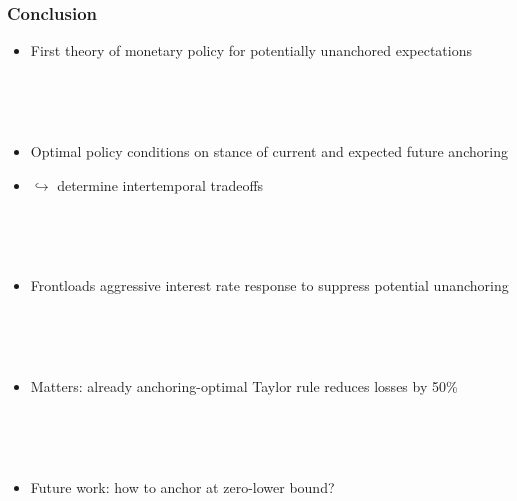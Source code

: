 \documentclass[10pt]{beamer}
\def\movei{5 }
\begin{document}
\begin{frame}
	\frametitle{Conclusion}

\vspace{0.5cm}
	
\begin{itemize}
\item First theory of monetary policy for potentially unanchored expectations 

\

\

\item Optimal policy conditions on stance of current and expected future anchoring
\item[] \hspace{4cm} $\hookrightarrow$ determine intertemporal tradeoffs

\

\

\item Frontloads aggressive interest rate response to suppress potential unanchoring

\

\

\item Matters: already anchoring-optimal Taylor rule reduces losses by 50\%

\

\

\item Future work: how to anchor at zero-lower bound?

\end{itemize}


\end{frame}



%

%	
%
\end{document}
